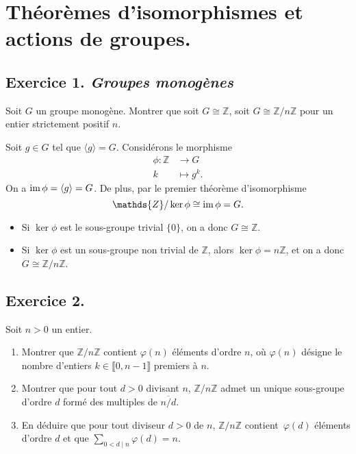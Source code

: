 \documentclass[./main]{subfiles}
\begin{document}
  \chapter{Théorèmes d'isomorphismes et actions de groupes.}
  \minitoc

  \section{Exercice 1. \textit{Groupes monogènes}}\label{td2-ex1}
  \begin{enonce}
    Soit $G$ un groupe monogène.
    Montrer que soit $G \cong \mathds{Z}$, soit $G \cong \mathds{Z} / n \mathds{Z}$ pour un entier strictement positif $n$.
  \end{enonce}

  Soit $g \in G$ tel que $\langle g \rangle = G$.
  Considérons le morphisme \begin{align*}
    \phi: \mathds{Z} &\longrightarrow G \\
    k &\longmapsto g^k
  .\end{align*}
  On a $\operatorname{im} \phi = \langle g\rangle = G$.
  De plus, par le premier théorème d'isomorphisme \[
  \mathds{Z} / \ker \phi \cong \im \phi = G
  .\] 
  \begin{itemize}
    \item Si $\ker \phi$ est le sous-groupe trivial  $\{0\}$, on a donc $G \cong \mathds{Z}$.
    \item Si $\ker \phi$ est un sous-groupe non trivial de $\mathds{Z}$, alors  $\ker \phi = n\mathds{Z}$, et on a donc $G \cong \mathds{Z} / n \mathds{Z}$.
  \end{itemize}

  \section{Exercice 2.}
  \begin{enonce}
    Soit $n > 0$ un entier.
    \begin{enumerate}
      \item Montrer que $\mathds{Z}/n\mathds{Z}$ contient $\varphi(n)$ éléments d'ordre $n$, où $\varphi(n)$ désigne le nombre d'entiers  $k \in \llbracket 0, n-1 \rrbracket$ premiers à $n$.\label{td2-ex2-q1}
      \item Montrer que pour tout $d > 0$ divisant $n$, $\mathds{Z}/n\mathds{Z}$ admet un unique sous-groupe d'ordre $d$ formé des multiples de $\overline{n / d}$. \label{td2-ex2-q2}
      \item En déduire que pour tout diviseur $d > 0$ de $n$, $\mathds{Z}/n\mathds{Z}$ contient~$\varphi(d)$ éléments d'ordre $d$ et que $\sum_{0 < d  \mid n} \varphi(d) = n$.
    \end{enumerate}
  \end{enonce}
\end{document}
